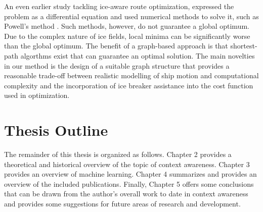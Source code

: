 An even earlier study tackling ice-aware route optimization, expressed the problem as a differential equation and used numerical methods to solve it, such as Powell's method \cite{kotovirta2009system}. Such methods, however, do not guarantee a global optimum. Due to the complex nature of ice fields, local minima can be significantly worse than the global optimum. The benefit of a graph-based approach is that shortest-path algorthms exist that can guarantee an optimal solution. The main novelties in our method is the design of a suitable graph structure that provides a reasonable trade-off between realistic modelling of ship motion and computational complexity and the incorporation of ice breaker assistance into the cost function used in optimization.  

\section{Thesis Outline}
\label{sec:outline}
 
The remainder of this thesis is organized as follows. Chapter 2 provides a theoretical and historical overview of the topic of context awareness. Chapter 3 provides an overview of machine learning. Chapter 4 summarizes and provides an overview of the included publications. Finally, Chapter 5 offers some conclusions that can be drawn from the author's overall work to date in context awareness and provides some suggestions for future areas of research and development.